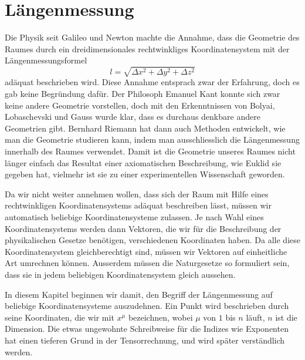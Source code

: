 %
%
%
\chapter{Längenmessung
\label{skript:kruemmung:section:laengenmessung}}
\rhead{}

Die Physik seit Galileo und Newton machte die Annahme, dass die
Geometrie des Raumes durch ein dreidimensionales rechtwinkliges
Koordinatensystem mit der Längenmessungsformel
\begin{equation}
l=\sqrt{\Delta x^2+\Delta y^2+\Delta z^2}
\label{skript:kruemmung:pytagoras}
\end{equation}
adäquat beschrieben wird.
Diese Annahme entsprach zwar der Erfahrung, doch es gab keine
Begründung dafür.
Der Philosoph Emanuel Kant konnte sich zwar keine andere Geometrie
vorstellen, doch mit den Erkenntnissen von Bolyai, Lobaschevski
und Gauss wurde klar, dass es durchaus denkbare andere Geometrien
gibt.
Bernhard Riemann hat dann auch Methoden entwickelt, wie man die
Geometrie studieren kann, indem man ausschliesslich die Längenmessung
innerhalb des Raumes verwendet.
Damit ist die Geometrie unseres Raumes nicht länger einfach das
Resultat einer axiomatischen Beschreibung, wie Euklid sie gegeben hat,
vielmehr ist sie zu einer experimentellen Wissenschaft geworden.

Da wir nicht weiter annehmen wollen, dass sich der Raum mit Hilfe
eines rechtwinkligen Koordinatensystems adäquat beschreiben lässt,
müssen wir automatisch beliebige Koordinatensysteme zulassen.
Je nach Wahl eines Koordinatensystems werden dann Vektoren, die
wir für die Beschreibung der physikalischen Gesetze benötigen,
verschiedenen Koordinaten haben.
Da alle diese Koordinatensystem gleichberechtigt sind, müssen
wir Vektoren auf einheitliche Art umrechnen können.
Ausserdem müssen die Naturgesetze so formuliert sein, dass
sie in jedem beliebigen Koordinatensystem gleich aussehen.

In diesem Kapitel beginnen wir damit, den Begriff der Längenmessung
auf beliebige Koordinatensysteme auszudehnen.
Ein Punkt wird beschrieben durch seine Koordinaten, die wir mit
$x^\mu$ bezeichnen, wobei $\mu$ von $1$ bis $n$ läuft, $n$
ist die Dimension. 
Die etwas ungewohnte Schreibweise für die Indizes wie Exponenten
hat einen tieferen Grund in der Tensorrechnung, und wird später
verständlich werden.

